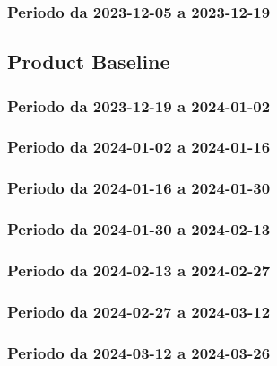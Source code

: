 \documentclass[10pt, a4paper]{article}
\begin{document}
{{{{{{{\subsubsection{Periodo da 2023-12-05 a 2023-12-19}





\subsection{Product Baseline}



\subsubsection{Periodo da 2023-12-19 a 2024-01-02}



\subsubsection{Periodo da 2024-01-02 a 2024-01-16}



\subsubsection{Periodo da 2024-01-16 a 2024-01-30}



\subsubsection{Periodo da 2024-01-30 a 2024-02-13}



\subsubsection{Periodo da 2024-02-13 a 2024-02-27}



\subsubsection{Periodo da 2024-02-27 a 2024-03-12}


\subsubsection{Periodo da 2024-03-12 a 2024-03-26}



}}}}}}}
\end{document}

